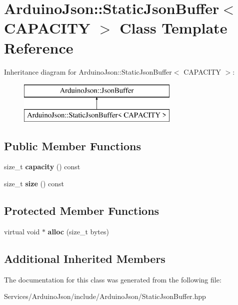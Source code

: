 \hypertarget{class_arduino_json_1_1_static_json_buffer}{}\section{Arduino\+Json\+:\+:Static\+Json\+Buffer$<$ C\+A\+P\+A\+C\+I\+T\+Y $>$ Class Template Reference}
\label{class_arduino_json_1_1_static_json_buffer}
Inheritance diagram for Arduino\+Json\+:\+:Static\+Json\+Buffer$<$ C\+A\+P\+A\+C\+I\+T\+Y $>$\+:\begin{figure}[H]
\begin{center}
\leavevmode
\includegraphics[height=2.000000cm]{class_arduino_json_1_1_static_json_buffer}
\end{center}
\end{figure}
\subsection*{Public Member Functions}
\begin{DoxyCompactItemize}
\item 
\hypertarget{class_arduino_json_1_1_static_json_buffer_ac7d04899629c73f8c8880725d16c4c7a}{}size\+\_\+t {\bfseries capacity} () const \label{class_arduino_json_1_1_static_json_buffer_ac7d04899629c73f8c8880725d16c4c7a}

\item 
\hypertarget{class_arduino_json_1_1_static_json_buffer_a58a2e4f0ecae55e0f74a67ed6084873c}{}size\+\_\+t {\bfseries size} () const \label{class_arduino_json_1_1_static_json_buffer_a58a2e4f0ecae55e0f74a67ed6084873c}

\end{DoxyCompactItemize}
\subsection*{Protected Member Functions}
\begin{DoxyCompactItemize}
\item 
\hypertarget{class_arduino_json_1_1_static_json_buffer_ac8a52d27c9f466104283e13fbf081444}{}virtual void $\ast$ {\bfseries alloc} (size\+\_\+t bytes)\label{class_arduino_json_1_1_static_json_buffer_ac8a52d27c9f466104283e13fbf081444}

\end{DoxyCompactItemize}
\subsection*{Additional Inherited Members}


The documentation for this class was generated from the following file\+:\begin{DoxyCompactItemize}
\item 
Services/\+Arduino\+Json/include/\+Arduino\+Json/Static\+Json\+Buffer.\+hpp\end{DoxyCompactItemize}
